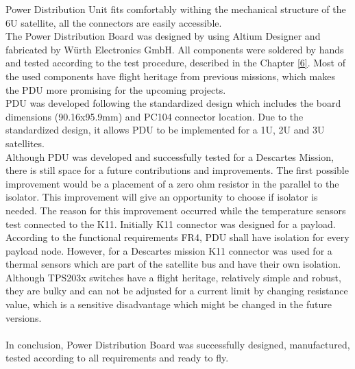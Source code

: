 Power Distribution Unit fits comfortably withing the mechanical structure of the 6U satellite, all the connectors are easily accessible. 
\\
The Power Distribution Board was designed by using Altium Designer and fabricated by Würth Electronics GmbH. All components were soldered by hands and tested according to the test procedure, described in the Chapter \ref{6}. Most of the used components have flight heritage from previous missions, which makes the PDU more promising for the upcoming projects.  \\ 
PDU was developed following the standardized design which includes the board dimensions (90.16x95.9mm) and PC104 connector location.
Due to the standardized design, it allows PDU to be implemented for a 1U, 2U and 3U satellites. \\
Although PDU was developed and successfully tested for a Descartes Mission, there is still space for a future contributions and improvements. The first possible improvement would be a placement of a zero ohm resistor in the parallel to the isolator. This improvement will give an opportunity to choose if isolator is needed. The reason for this improvement occurred while the temperature sensors test connected to the K11. Initially K11 connector was designed for a payload. According to the functional requirements FR4, PDU shall have isolation for every payload node. However, for a Descartes mission K11 connector was used for a thermal sensors which are part of the satellite bus and have their own isolation. Although TPS203x switches have a flight heritage, relatively simple and robust, they are bulky and can not be adjusted for a current limit by changing resistance value, which is a sensitive disadvantage which might be changed in the future versions.  \\ \\

In conclusion, Power Distribution Board was successfully designed,  manufactured, tested according to all requirements and ready to fly. 
